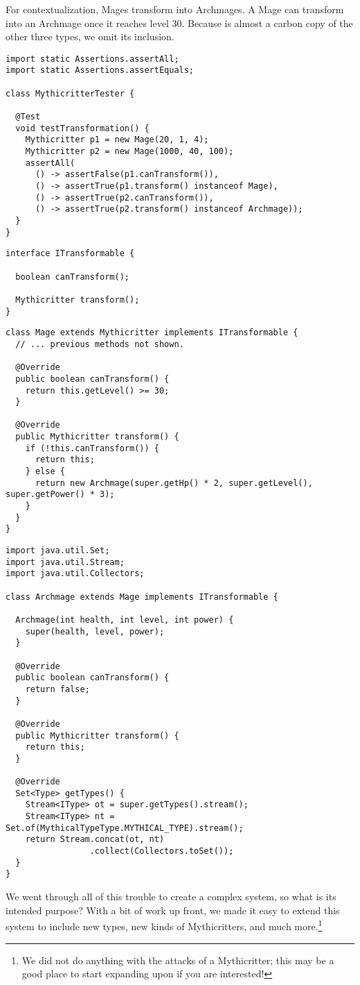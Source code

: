 For contextualization, Mages transform into Archmages. A Mage can transform into an Archmage once it reaches level 30. Because  is almost a carbon copy of the other three types, we omit its inclusion.

\begin{lstlisting}[language=MyJava]
import static Assertions.assertAll;
import static Assertions.assertEquals;

class MythicritterTester {

  @Test 
  void testTransformation() {
    Mythicritter p1 = new Mage(20, 1, 4);
    Mythicritter p2 = new Mage(1000, 40, 100);
    assertAll(
      () -> assertFalse(p1.canTransform()),
      () -> assertTrue(p1.transform() instanceof Mage),
      () -> assertTrue(p2.canTransform()),
      () -> assertTrue(p2.transform() instanceof Archmage));
  }
}
\end{lstlisting}

\begin{lstlisting}[language=MyJava]
interface ITransformable {

  boolean canTransform();

  Mythicritter transform();
}
\end{lstlisting}

\begin{lstlisting}[language=MyJava]
class Mage extends Mythicritter implements ITransformable {
  // ... previous methods not shown.

  @Override
  public boolean canTransform() {
    return this.getLevel() >= 30;
  }

  @Override
  public Mythicritter transform() {
    if (!this.canTransform()) {
      return this;
    } else {
      return new Archmage(super.getHp() * 2, super.getLevel(), super.getPower() * 3);
    }
  }
}
\end{lstlisting}

\begin{lstlisting}[language=MyJava]
import java.util.Set;
import java.util.Stream;
import java.util.Collectors;

class Archmage extends Mage implements ITransformable {

  Archmage(int health, int level, int power) {
    super(health, level, power);
  }

  @Override 
  public boolean canTransform() {
    return false;
  }

  @Override
  public Mythicritter transform() {
    return this;
  }

  @Override
  Set<Type> getTypes() {
    Stream<IType> ot = super.getTypes().stream();
    Stream<IType> nt = Set.of(MythicalTypeType.MYTHICAL_TYPE).stream();
    return Stream.concat(ot, nt)
                 .collect(Collectors.toSet());
  }
}
\end{lstlisting}

We went through all of this trouble to create a complex system, so what is its intended purpose? With a bit of work up front, we made it easy to extend this system to include new types, new kinds of Mythicritters, and much more.\footnote{We did not do anything with the attacks of a Mythicritter; this may be a good place to start expanding upon if you are interested!}